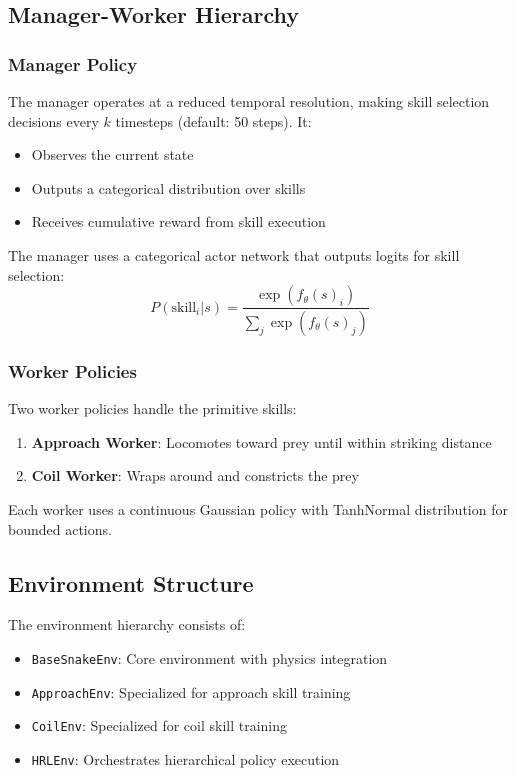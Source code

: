 \documentclass[11pt]{article}
\begin{document}
\subsection{Manager-Worker Hierarchy}

\subsubsection{Manager Policy}

The manager operates at a reduced temporal resolution, making skill selection decisions every $k$ timesteps (default: 50 steps). It:
\begin{itemize}
    \item Observes the current state
    \item Outputs a categorical distribution over skills
    \item Receives cumulative reward from skill execution
\end{itemize}

The manager uses a categorical actor network that outputs logits for skill selection:
\begin{equation}
    P(\text{skill}_i | s) = \frac{\exp(f_\theta(s)_i)}{\sum_j \exp(f_\theta(s)_j)}
\end{equation}

\subsubsection{Worker Policies}

Two worker policies handle the primitive skills:
\begin{enumerate}
    \item \textbf{Approach Worker}: Locomotes toward prey until within striking distance
    \item \textbf{Coil Worker}: Wraps around and constricts the prey
\end{enumerate}

Each worker uses a continuous Gaussian policy with TanhNormal distribution for bounded actions.

\subsection{Environment Structure}

The environment hierarchy consists of:
\begin{itemize}
    \item \texttt{BaseSnakeEnv}: Core environment with physics integration
    \item \texttt{ApproachEnv}: Specialized for approach skill training
    \item \texttt{CoilEnv}: Specialized for coil skill training
    \item \texttt{HRLEnv}: Orchestrates hierarchical policy execution
\end{itemize}
\end{document}
